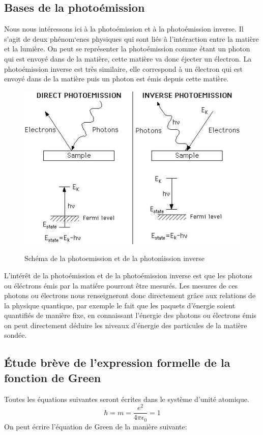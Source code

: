 \documentclass[12pt]{article}
\begin{document}
\subsection{Bases de la photo\'emission}
Nous nous int\'eressons ici \`a la photo\'emission et \`a la photo\'emission inverse.
Il s'agit de deux ph\'enom`enes physiques qui sont li\'es \`a l'int\'eraction entre la mati\`ere
et la lumi\`ere.
\newline
On peut se repr\'esenter la photo\'emission comme \'etant un photon qui est envoy\'e dans de la mati\`ere,
cette mati\`ere va donc \'ejecter un \'electron. La photo\'emission inverse est tr\`es similaire, elle correspond \`a
un \'electron qui est envoy\'e dans de la mati\`ere puis un photon est \'emis depuis cette mati\`ere.
\begin{figure}
\includegraphics[width = \textwidth]{photoem.jpg}
 \label{photoEm}
\caption{Sch\'ema de  la photoemission et de la photo\'mission inverse}
\end{figure}
L'int\'er\^et de la photo\'emission et de la photo\'emission inverse est que les photons ou \'el\'ectrons
\'emis par la mati\'ere pourront \^etre mesur\'es. Les mesures de ces photons ou \'electrons nous renseigneront donc directement
gr\^ace aux relations de la physique quantique, par exemple le fait que les paquets d'\'energie soient quantifi\'es de mani\`ere fixe,
en connaissant l'\'energie des photons ou \'electrons \'emis on peut directement d\'eduire les niveaux d'\'energie des particules de la mati\`ere sond\'ee.

\subsection{\'Etude br\`eve de l'expression formelle de la fonction de Green}
Toutes les \'equations suivantes seront \'ecrites dans le syst\`eme d'unit\'e atomique.
\begin{equation}
 \hbar = m = \frac{e^2}{4 \pi \epsilon_0} = 1
\end{equation}
On peut \'ecrire l'\'equation de Green de la mani\`ere suivante:
\end{document}
